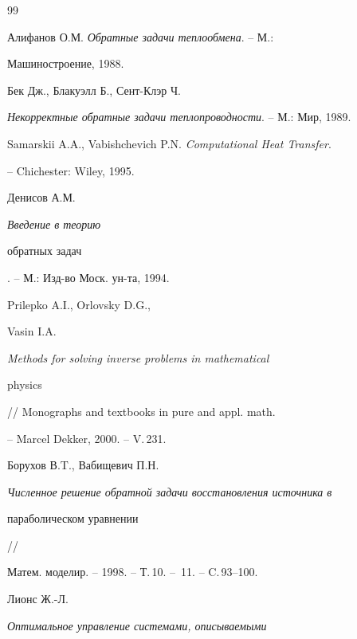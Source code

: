\begin{thebibliography}{99}







Алифанов О.М. {\it Обратные  задачи  теплообмена}. --  М.:


Машиностроение, 1988.







Бек Дж., Блакуэлл Б., Сент-Клэр Ч.


{\it Некорректные обратные задачи теплопроводности}. -- М.: Мир, 1989.







Samarskii A.A., Vabishchevich P.N. {\it Computational Heat Transfer}.


-- Chichester: Wiley, 1995.







Денисов А.М. {\it  Введение в теорию


обратных задач}. -- М.: Изд-во Моск. ун-та, 1994.







Prilepko A.I., Orlovsky D.G.,


Vasin I.A. {\it Methods for solving inverse problems in mathematical


physics} // Monographs and textbooks in pure and appl. math.


--  Marcel Dekker, 2000. -- V.\,231. 







Борухов В.T., Вабищевич П.Н.


{\it Численное решение обратной задачи восстановления источника в


параболическом уравнении} //


Матем. моделир. -- 1998. -- Т.\,10. -- \No\,11. -- C.\,93--100.







Лионс Ж.-Л. {\it Оптимальное управление системами, описываемыми


}
\end{thebibliography}
